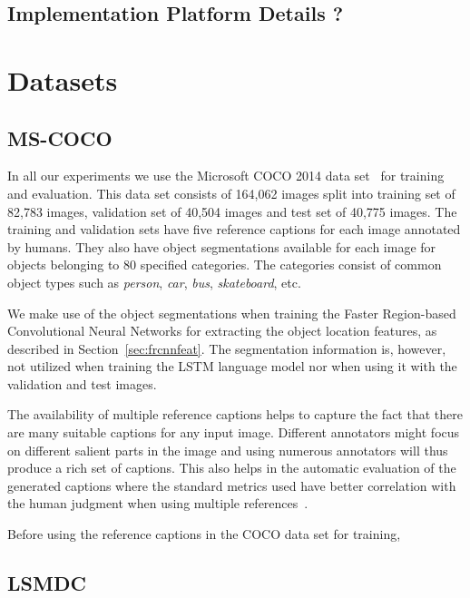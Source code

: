 \subsection{Implementation Platform Details ?}
\section{Datasets}
\subsection{MS-COCO}
In all our experiments we use the Microsoft COCO 2014
data set~\cite{Lin2014} for training and evaluation.
This data set consists of 164,062 images split into training set of
82,783 images, validation set of 40,504 images and test set of 40,775
images. 
The training and validation sets have five reference captions for each
image annotated by humans. 
They also have object segmentations available for each image for
objects belonging to 80 specified categories.
The categories consist of common object types such as \emph{person},
\emph{car}, \emph{bus}, \emph{skateboard}, etc.

We make use of the object segmentations when training the Faster
Region-based Convolutional Neural Networks for extracting the object
location features, as described in Section~\ref{sec:frcnnfeat}.
The segmentation information is, however, not utilized when training
the LSTM language model nor when using it with the validation and test
images.

The availability of multiple reference captions helps to capture the
fact that there are many suitable captions for any input image.
Different annotators might focus on different salient parts in the
image and using numerous annotators will thus produce a rich set of
captions.
This also helps in the automatic evaluation of the generated captions
where the standard metrics used have better correlation with the human
judgment when using multiple references~\cite{Vedantam_2015_CVPR}.

Before using the reference captions in the COCO data set for training,

\subsection{LSMDC}
